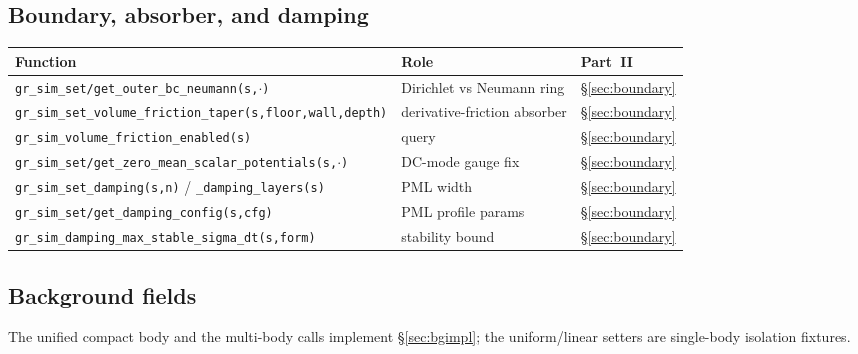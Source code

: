 \documentclass[11pt]{article}
\begin{document}
\subsection{Boundary, absorber, and damping}
\nopagebreak
{\footnotesize
\begin{tabular}{@{}F{8.2cm}L{4.9cm}L{1.4cm}@{}}
\toprule
\textbf{Function} & \textbf{Role} & \textbf{Part~II} \\
\midrule
\texttt{gr\_sim\_set/get\_outer\_bc\_neumann(s,$\cdot$)} & Dirichlet vs Neumann ring & \S\ref{sec:boundary} \\
\texttt{gr\_sim\_set\_volume\_friction\_taper(s,floor,wall,depth)} & derivative-friction absorber & \S\ref{sec:boundary} \\
\texttt{gr\_sim\_volume\_friction\_enabled(s)} & query & \S\ref{sec:boundary} \\
\texttt{gr\_sim\_set/get\_zero\_mean\_scalar\_potentials(s,$\cdot$)} & DC-mode gauge fix & \S\ref{sec:boundary} \\
\texttt{gr\_sim\_set\_damping(s,n)} / \texttt{\_damping\_layers(s)} & PML width & \S\ref{sec:boundary} \\
\texttt{gr\_sim\_set/get\_damping\_config(s,cfg)} & PML profile params & \S\ref{sec:boundary} \\
\texttt{gr\_sim\_damping\_max\_stable\_sigma\_dt(s,form)} & stability bound & \S\ref{sec:boundary} \\
\bottomrule
\end{tabular}}

\subsection{Background fields}
The unified compact body and the multi-body calls implement \S\ref{sec:bgimpl};
the uniform/linear setters are single-body isolation fixtures.
\end{document}
